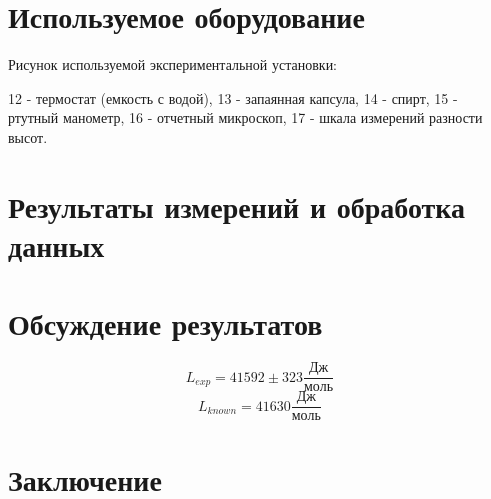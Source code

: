 \documentclass[1 pt]{article}
\begin{document}
\section{Используемое оборудование}
Рисунок используемой экспериментальной установки:
\begin{center}
    
\end{center}
12 - термостат (емкость с водой),
13 - запаянная капсула,
14 - спирт,
15 - ртутный манометр,
16 - отчетный микроскоп,
17 - шкала измерений разности высот.
\newpage
\section{Результаты измерений и обработка данных}
 \begin{center}
     
 \end{center}
\section{Обсуждение результатов}
\begin{equation*}
    L_{exp} = 41592 \pm 323 \frac{Дж}{моль}
\end{equation*}
\begin{equation*}
    L_{known} = 41630 \frac{Дж}{моль}
\end{equation*}
\newpage
\section{Заключение}
\end{document}
